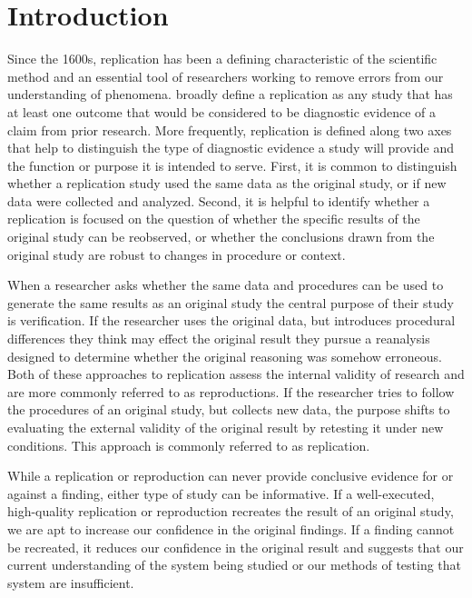 \documentclass[]{interact}
\theoremstyle{plain}%
\theoremstyle{definition}
\theoremstyle{remark}
\begin{document}
\section*{Introduction}
Since the 1600s, replication has been a defining characteristic of the scientific method and an essential tool of researchers working to remove errors from our understanding of phenomena. 
\citet{nosek2020} broadly define a replication as any study that has at least one outcome that would be considered to be diagnostic evidence of a claim from prior research.
More frequently, replication is defined along two axes that help to distinguish the type of diagnostic evidence a study will provide and the function or purpose it is intended to serve. 
First, it is common to distinguish whether a replication study used the same data as the original study, or if new data were collected and analyzed. 
Second, it is helpful to identify whether a replication is focused on the question of whether the specific results of the original study can be reobserved, or whether the conclusions drawn from the original study are robust to changes in procedure or context.

When a researcher asks whether the same data and procedures can be used to generate the same results as an original study the central purpose of their study is verification.
If the researcher uses the original data, but introduces procedural differences they think may effect the original result they pursue a reanalysis designed to determine whether the original reasoning was somehow erroneous. 
Both of these approaches to replication assess the internal validity of research and are more commonly referred to as reproductions.
If the researcher tries to follow the procedures of an original study, but collects new data, the purpose shifts to evaluating the external validity of the original result by retesting it under new conditions.
This approach is commonly referred to as replication. 

While a replication or reproduction can never provide conclusive evidence for or against a finding, either type of study can be informative. 
If a well-executed, high-quality replication or reproduction recreates the result of an original study, we are apt to increase our confidence in the original findings. 
If a finding cannot be recreated, it reduces our confidence in the original result and suggests that our current understanding of the system being studied or our methods of testing that system are insufficient.


\end{document}
